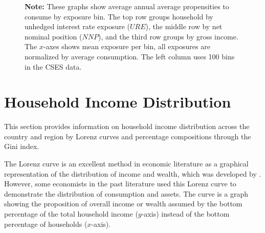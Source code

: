 \documentclass[11pt,letterpaper]{article}
\begin{document}
\begin{figure}[H]
	\begin{tablenotes}
		\footnotesize
		\item \textbf{Note:} These graphs show average annual average propensities to consume by exposure bin. The top row groups household by unhedged interest rate exposure ($URE$), the middle row by net nominal position ($NNP$), and the third row groups by gross income. The $x$-axes shows mean exposure per bin, all exposures are normalized by average consumption. The left column uses 100 bins in the CSES data.    
	\end{tablenotes} 
	

\end{figure}


\section{Household Income Distribution}\label{sec:r3}
This section provides information on household income distribution across the country and region by Lorenz curves and percentage compositions through the Gini index. 

The Lorenz curve is an excellent method in economic literature as a graphical representation of the distribution of income and wealth, which was developed by \citet{Lorenz1905}. However, some economists in the past literature used this Lorenz curve to demonstrate the distribution of consumption and assets. The curve is a graph showing the proposition of overall income or wealth assumed by the bottom percentage of the total household income ($y$-axis) instead of the bottom percentage of households ($x$-axis).  
\end{document}
